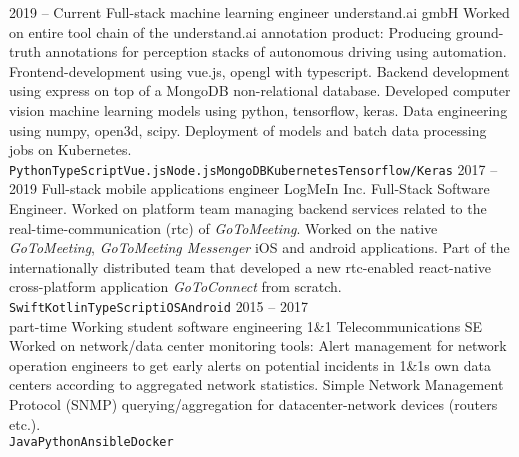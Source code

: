 \documentclass[8pt]{developercv} %
\newcommand{\linebreaksmall}{\vspace{2mm}}
\begin{document}
\begin{entrylist}
	\entry
		{2019 -- Current}
		{Full-stack machine learning engineer}
		{understand.ai gmbH}
		{Worked on entire tool chain of the understand.ai annotation product: Producing ground-truth annotations for perception stacks of autonomous driving using automation. Frontend-development using vue.js, opengl with typescript. Backend development using express on top of a MongoDB non-relational database. Developed computer vision machine learning models using python, tensorflow, keras. Data engineering using numpy, open3d, scipy. Deployment of models and batch data processing jobs on Kubernetes.
		\linebreaksmall \\ \texttt{Python}\slashsep\texttt{TypeScript}\slashsep\texttt{Vue.js}\slashsep\texttt{Node.js}\slashsep\texttt{MongoDB}\slashsep\texttt{Kubernetes}\slashsep\texttt{Tensorflow/Keras}} \linebreaksmall
	\entry
		{2017 -- 2019}
		{Full-stack mobile applications engineer}
		{LogMeIn Inc.}
		{Full-Stack Software Engineer. Worked on platform team managing backend services related to the real-time-communication (rtc) of \textit{GoToMeeting}. Worked on the native \textit{GoToMeeting}, \textit{GoToMeeting Messenger} iOS and android applications. Part of the internationally distributed team that developed a new rtc-enabled react-native cross-platform application \textit{GoToConnect} from scratch.
		\linebreaksmall \\ \texttt{Swift}\slashsep\texttt{Kotlin}\slashsep\texttt{TypeScript}\slashsep\texttt{iOS}\slashsep\texttt{Android}} \linebreaksmall
	\entry
		{2015 -- 2017\\\footnotesize{part-time}}
		{Working student software engineering}
		{1\&1 Telecommunications SE}
		{Worked on network/data center monitoring tools: Alert management for network operation engineers to get early alerts on potential incidents in 1\&1s own data centers according to aggregated network statistics. Simple Network Management Protocol (SNMP) querying/aggregation for datacenter-network devices (routers etc.).
		\linebreaksmall \\ \texttt{Java}\slashsep\texttt{Python}\slashsep\texttt{Ansible}\slashsep\texttt{Docker}}
\end{entrylist}


\end{document}

